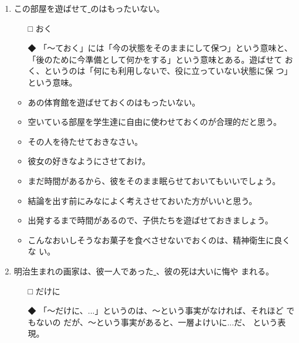 \documentclass[
uplatex,
b5paper,
10pt,
dvipdfmx
]{jsbook}
\begin{document}
\begin{enumerate}
\item この部屋を遊ばせて\underline{  }のはもったいない。

\begin{itemize}
\item[□] おく
\item[◆] 「〜ておく」には「今の状態をそのままにして保つ」という意味と、
	  「後のために今準備として何かをする」という意味とある。遊ばせて
	  おく、というのは「何にも利用しないで、役に立っていない状態に保
	  つ」という意味。
\end{itemize}

\begin{itemize}
\item あの体育館を遊ばせておくのはもったいない。
\item 空いている部屋を学生達に自由に使わせておくのが合理的だと思う。
\item その人を待たせておきなさい。
\item 彼女の好きなようにさせておけ。
\item まだ時間があるから、彼をそのまま眠らせておいてもいいでしょう。
\item 結論を出す前にみなによく考えさせておいた方がいいと思う。
\item 出発するまで時間があるので、子供たちを遊ばせておきましょう。
\item こんなおいしそうなお菓子を食べさせないでおくのは、精神衛生に良くな
      い。
\end{itemize}

\item 明治生まれの画家は、彼一人であった\underline{    }、彼の死は大いに悔や
      まれる。
\begin{itemize}
\item[□] だけに
\item[◆] 「〜だけに、...」というのは、〜という事実がなければ、それほど
	  でもないの だが、〜という事実があると、一層よけいに...だ、
	  という表現。
\end{itemize}


\end{enumerate}
\end{document}

